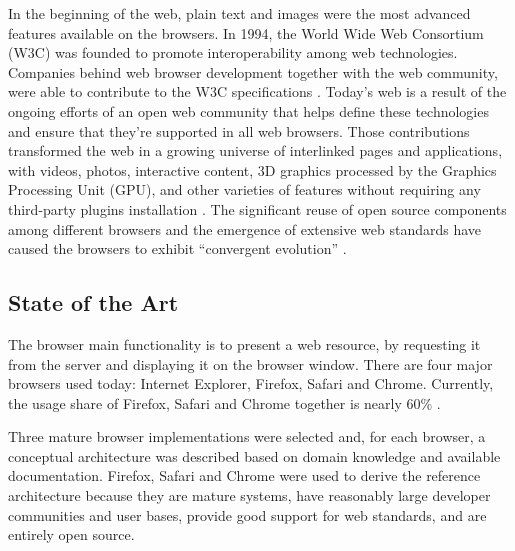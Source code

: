 In the beginning of the web, plain text and images were the most advanced features available on the browsers. In 1994, the World Wide Web Consortium (W3C) was founded to promote interoperability among web technologies. Companies behind web browser development together with the web community, were able to contribute to the W3C specifications \cite{WC2006}. Today's web is a result of the ongoing efforts of an open web community that helps define these technologies and ensure that they're supported in all web browsers. Those contributions transformed the web in a growing universe of interlinked pages and applications, with videos, photos, interactive content, 3D graphics processed by the Graphics Processing Unit (GPU), and other varieties of features without requiring any third-party plugins installation \cite{Hickson2013}. The significant reuse of open source components among different browsers and the emergence of extensive web standards have caused the browsers to exhibit ``convergent evolution'' \cite{Grosskurth2005}.

\subsection{State of the Art} %
\label{sub:basic_concepts:web:state_of_the_art}

The browser main functionality is to present a web resource, by requesting it from the server and displaying it on the browser window. There are four major browsers used today: Internet Explorer, Firefox, Safari and Chrome. Currently, the usage share of Firefox, Safari and Chrome together is nearly 60\% \cite{Traffic2013}.

Three mature browser implementations were selected and, for each browser, a conceptual architecture was described based on domain knowledge and available documentation. Firefox, Safari and Chrome were used to derive the reference architecture because they are mature systems, have reasonably large developer communities and user bases, provide good support for web standards, and are entirely open source.

